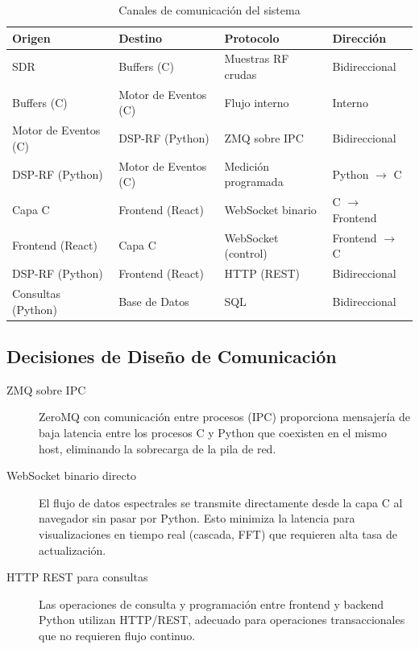 \documentclass[12pt,a4paper]{article}
\begin{document}
\begin{table}[H]
\centering
\caption{Canales de comunicación del sistema}
\label{tab:channels}
\begin{tabular}{@{}llll@{}}
\toprule
\textbf{Origen} & \textbf{Destino} & \textbf{Protocolo} & \textbf{Dirección} \\
\midrule
SDR & Buffers (C) & Muestras RF crudas & Bidireccional \\
Buffers (C) & Motor de Eventos (C) & Flujo interno & Interno \\
Motor de Eventos (C) & DSP-RF (Python) & ZMQ sobre IPC & Bidireccional \\
DSP-RF (Python) & Motor de Eventos (C) & Medición programada & Python $\to$ C \\
Capa C & Frontend (React) & WebSocket binario & C $\to$ Frontend \\
Frontend (React) & Capa C & WebSocket (control) & Frontend $\to$ C \\
DSP-RF (Python) & Frontend (React) & HTTP (REST) & Bidireccional \\
Consultas (Python) & Base de Datos & SQL & Bidireccional \\
\bottomrule
\end{tabular}
\end{table}

\subsection{Decisiones de Diseño de Comunicación}

\begin{description}
  \item[ZMQ sobre IPC] ZeroMQ con comunicación entre procesos (IPC) proporciona mensajería de baja latencia entre los procesos C y Python que coexisten en el mismo host, eliminando la sobrecarga de la pila de red.
  \item[WebSocket binario directo] El flujo de datos espectrales se transmite directamente desde la capa C al navegador sin pasar por Python. Esto minimiza la latencia para visualizaciones en tiempo real (cascada, FFT) que requieren alta tasa de actualización.
  \item[HTTP REST para consultas] Las operaciones de consulta y programación entre frontend y backend Python utilizan HTTP/REST, adecuado para operaciones transaccionales que no requieren flujo continuo.
\end{description}

\end{document}
